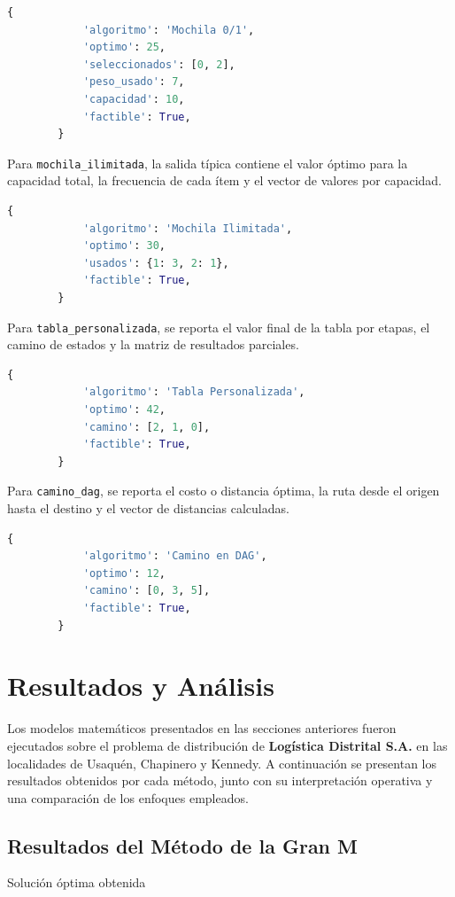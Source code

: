 \documentclass[12pt]{article}
\begin{document}
	\begin{lstlisting}[language=Python]
		{
			'algoritmo': 'Mochila 0/1',
			'optimo': 25,
			'seleccionados': [0, 2],
			'peso_usado': 7,
			'capacidad': 10,
			'factible': True,
		}
	\end{lstlisting}
	
	Para \texttt{mochila\_ilimitada}, la salida típica contiene el valor óptimo para la capacidad total, la frecuencia de cada ítem y el vector de valores por capacidad.
	
	\begin{lstlisting}[language=Python]
		{
			'algoritmo': 'Mochila Ilimitada',
			'optimo': 30,
			'usados': {1: 3, 2: 1},
			'factible': True,
		}
	\end{lstlisting}
	
	Para \texttt{tabla\_personalizada}, se reporta el valor final de la tabla por etapas, el camino de estados y la matriz de resultados parciales.
	
	\begin{lstlisting}[language=Python]
		{
			'algoritmo': 'Tabla Personalizada',
			'optimo': 42,
			'camino': [2, 1, 0],
			'factible': True,
		}
	\end{lstlisting}
	
	Para \texttt{camino\_dag}, se reporta el costo o distancia óptima, la ruta desde el origen hasta el destino y el vector de distancias calculadas.
	
	\begin{lstlisting}[language=Python]
		{
			'algoritmo': 'Camino en DAG',
			'optimo': 12,
			'camino': [0, 3, 5],
			'factible': True,
		}
	\end{lstlisting}
\section{Resultados y Análisis}

Los modelos matemáticos presentados en las secciones anteriores fueron ejecutados sobre el problema de distribución de \textbf{Logística Distrital S.A.} en las localidades de Usaquén, Chapinero y Kennedy. A continuación se presentan los resultados obtenidos por cada método, junto con su interpretación operativa y una comparación de los enfoques empleados.

\subsection{Resultados del Método de la Gran M}

\begin{accentbar}
	Solución óptima obtenida
\end{accentbar}
\end{document}
